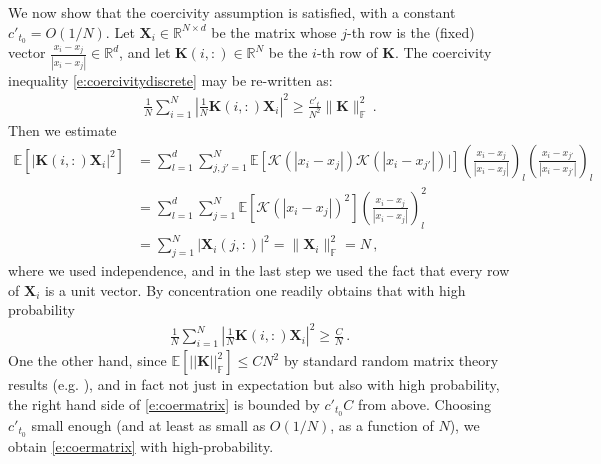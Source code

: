 We now show that the coercivity assumption is satisfied, with a constant $c'_{t_0}=O(1/N)$. Let $\mathbf{X}_i\in\mathbb{R}^{N\times d}$ be the matrix whose $j$-th row is the (fixed) vector $\frac{x_i-x_j}{|x_i-x_j|}\in\mathbb{R}^d$, and let $\mathbf{K}(i,:)\in\mathbb{R}^N$ be the $i$-th row of $\mathbf{K}$. The coercivity inequality \eqref{e:coercivitydiscrete} may be re-written as:
\begin{align}
\frac 1N\sum_{i=1}^N\left|\frac1N\mathbf{K}(i,:)\mathbf{X}_i\right|^2\ge\frac{c'_t}{N^2}\|\mathbf{K}\|^2_{\mathbb{F}}\,.
\label{e:coermatrix}
\end{align}
Then we estimate
\begin{align*}
\mathbb{E}\left[|\mathbf{K}(i,:)\mathbf{X}_i|^2\right]
&=\sum_{l=1}^d\sum_{j,j'=1}^N\mathbb{E}\left[\mathcal{K}(|x_i-x_j|)\mathcal{K}(|x_i-x_{j'}|)|\right] \left(\frac{x_i-x_j}{|x_i-x_j|}\right)_l \left(\frac{x_i-x_{j'}}{|x_i-x_{j'}|}\right)_l\\
&=\sum_{l=1}^d\sum_{j=1}^N \mathbb{E}\left[\mathcal{K}(|x_i-x_j|)^2\right] \left(\frac{x_i-x_j}{|x_i-x_j|}\right)^2_l \\
&= \sum_{j=1}^N |\mathbf{X}_i(j,:)|^2 = \| \mathbf{X}_i\|^2_{\mathbb{F}}=N\,,
\end{align*}
where we used independence, %
and in the last step we used the fact that every row of $\mathbf{X}_i$ is a unit vector. By concentration one readily obtains that with high probability
\begin{align*}
\frac 1N\sum_{i=1}^N\left|\frac1N\mathbf{K}(i,:)\mathbf{X}_i\right|^2\ge\frac CN\,.
\end{align*}
One the other hand, since $\mathbb{E}[||\mathbf{K}||^2_{\mathbb{F}}]\le CN^2$ by standard random matrix theory results (e.g. \cite{Vershynin:NARMT}), and in fact not just in expectation but also with high probability, the right hand side of \eqref{e:coermatrix} is bounded by $c'_{t_0}C$ from above. Choosing $c'_{t_0}$ small enough (and at least as small as $O(1/N)$, as a function of $N$), we obtain \eqref{e:coermatrix} with high-probability.

